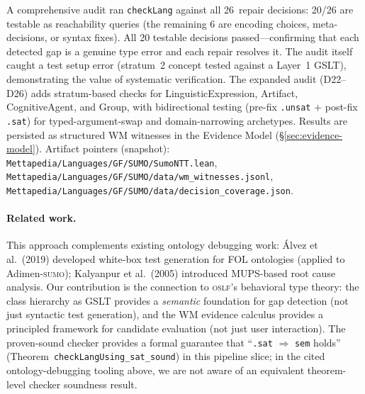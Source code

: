 \documentclass[11pt]{article}
\newcommand{\SUMO}{\textsc{sumo}}
\newcommand{\OSLF}{\textsc{oslf}}
\theoremstyle{definition}
\theoremstyle{plain}
\begin{document}
A comprehensive audit ran \texttt{checkLang} against all 26~repair
decisions: 20/26 are testable as reachability queries (the remaining
6 are encoding choices, meta-decisions, or syntax fixes).
All 20 testable decisions passed---confirming that each detected gap
is a genuine type error and each repair resolves it.  The audit
itself caught a test setup error (stratum~2 concept tested against a
Layer~1 GSLT), demonstrating the value of systematic verification.
The expanded audit (D22--D26) adds stratum-based checks for
LinguisticExpression, Artifact, CognitiveAgent, and Group,
with bidirectional testing (pre-fix \texttt{.unsat} $+$
post-fix \texttt{.sat}) for typed-argument-swap and
domain-narrowing archetypes.  Results are persisted as
structured WM witnesses in the Evidence Model
(\S\ref{sec:evidence-model}).
Artifact pointers (snapshot): \texttt{Mettapedia/Languages/GF/SUMO/SumoNTT.lean},
\texttt{Mettapedia/Languages/GF/SUMO/data/wm\_witnesses.jsonl},
\texttt{Mettapedia/Languages/GF/SUMO/data/decision\_coverage.json}.

\paragraph{Related work.}
This approach complements existing ontology debugging work:
\'Alvez et al.~(2019) developed white-box test generation for
FOL ontologies (applied to Adimen-\SUMO{}); Kalyanpur et al.~(2005)
introduced MUPS-based root cause analysis.  Our contribution is
the connection to \OSLF{}'s behavioral type theory: the class
hierarchy as GSLT provides a \emph{semantic} foundation for gap
detection (not just syntactic test generation), and the WM evidence
calculus provides a principled framework for candidate evaluation
(not just user interaction).  The proven-sound checker provides
a formal guarantee that ``\texttt{.sat} $\Rightarrow$ \texttt{sem}
holds'' (Theorem~\texttt{checkLangUsing\_sat\_sound}) in this pipeline
slice; in the cited ontology-debugging tooling above, we are not aware of
an equivalent theorem-level checker soundness result.
\end{document}
